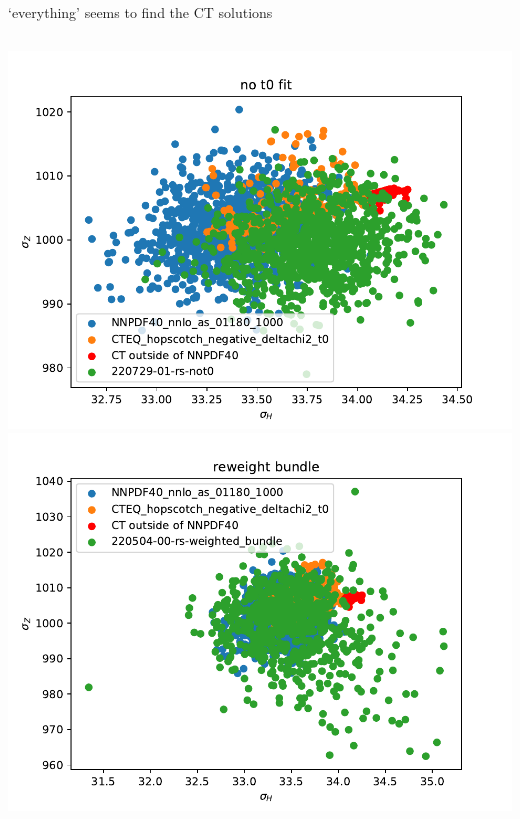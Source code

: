 \documentclass[aspectratio=169,10pt]{beamer}
\begin{document}
\begin{frame}[t]{`everything' seems to find the CT solutions}
\begin{columns}
\begin{column}{.7\textwidth}
      \includegraphics[height=.45\textheight]{no_t0_fit.pdf}
      \includegraphics[height=.45\textheight]{reweight_bundle.pdf}
    \end{column}
  \end{columns}
\end{frame}
\end{document}
